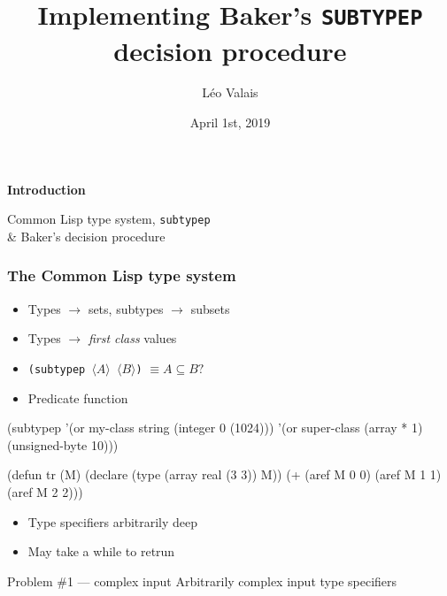 \documentclass[aspectratio=169]{beamer}
\title{Implementing Baker's \texttt{SUBTYPEP} decision procedure\vspace*{-5mm}}
\date{April 1st, 2019}
\author{Léo Valais}
\institute{European Lisp Symposium}
\renewcommand\code[1]{\texttt{#1}}
\newcommand\rarr{\ensuremath{\rightarrow}}
\newcommand\plholder[1]{\ensuremath{\langle {#1} \rangle}}
\begin{document}
\begin{frame}
\titlepage{}
\end{frame}

\newenvironment{sectionframe}[1]{%
  \begin{frame}[standout]
    \centering
    \Huge
    {\bf #1}

    {\usebeamercolor[bg]{secondary color}\noindent\sout{\hfill}}
    \bigskip

    \large
  }{\end{frame}}

\begin{sectionframe}{Introduction}
  Common Lisp type system, \code{subtypep} \\\& Baker's decision procedure
\end{sectionframe}

\begin{frame}[fragile]
  \frametitle{The Common Lisp type system}
  \begin{itemize}
  \item Types \rarr{} sets, subtypes \rarr{} subsets
  \item Types \rarr{} \emph{first class} values
  \end{itemize}

  \begin{itemize}
  \item<3-> \code{(subtypep \plholder A \plholder B)} $\equiv A \subseteq B?$
  \item<3-> Predicate function
  \end{itemize}

  \pause
  \medskip

  \begin{overprint}
\begin{clcode}
(subtypep '(or my-class string (integer 0 (1024)))
          '(or super-class
               (array * 1)
               (unsigned-byte 10)))
\end{clcode}

\begin{clcode}
(defun tr (M)
  (declare (type (array real (3 3)) M))
  (+ (aref M 0 0)
     (aref M 1 1)
     (aref M 2 2)))
\end{clcode}
  \end{overprint}

  \begin{popup}{.75}
    \begin{macosbox}{}
      \begin{itemize}
      \item Type specifiers arbitrarily deep
      \item May take a while to retrun
      \end{itemize}

      \begin{alertblock}{Problem \#1 --- complex input}
        Arbitrarily complex input type specifiers
      \end{alertblock}
    \end{macosbox}
  \end{popup}
\end{frame}
\end{document}
